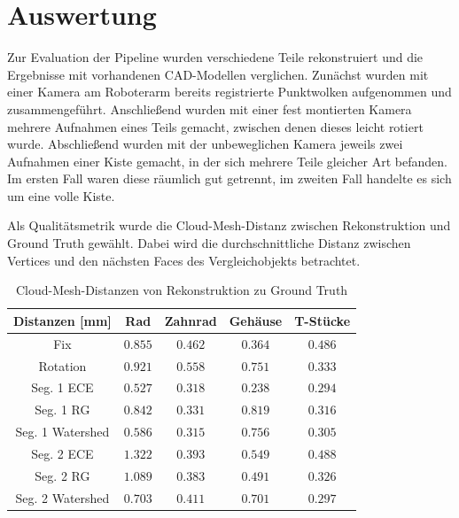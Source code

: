 
\chapter{Auswertung}
\label{ch:auswertung}

Zur Evaluation der Pipeline wurden verschiedene Teile rekonstruiert und die Ergebnisse mit vorhandenen CAD-Modellen verglichen.
Zunächst wurden mit einer Kamera am Roboterarm bereits registrierte Punktwolken aufgenommen und zusammengeführt.
Anschließend wurden mit einer fest montierten Kamera mehrere Aufnahmen eines Teils gemacht, zwischen denen dieses leicht rotiert wurde.
Abschließend wurden mit der unbeweglichen Kamera jeweils zwei Aufnahmen einer Kiste gemacht, in der sich mehrere Teile gleicher Art befanden.
Im ersten Fall waren diese räumlich gut getrennt, im zweiten Fall handelte es sich um eine volle Kiste.

Als Qualitätsmetrik wurde die Cloud-Mesh-Distanz zwischen Rekonstruktion und Ground Truth gewählt.
Dabei wird die durchschnittliche Distanz zwischen Vertices und den nächsten Faces des Vergleichobjekts betrachtet.

\begin{table}[H]
	\centering
	\begin{tabular}{| c || c | c | c | c |}
		\hline
		\textbf{Distanzen [mm]} & Rad & Zahnrad & Gehäuse & T-Stücke\\
		\hline\hline
		Fix & $0.855$ & $0.462$ & $0.364$ & $0.486$\\
		\hline
		Rotation & $0.921$ & $0.558$ & $0.751$ & $0.333$\\
		\hline
		Seg. 1 \ac{ECE} & $0.527$ & $0.318$ & $0.238$ & $0.294$\\
		\hline
		Seg. 1 \ac{RG} & $0.842$ & $0.331$ & $0.819$ & $0.316$\\
		\hline
		Seg. 1 Watershed & $0.586$ & $0.315$ & $0.756$ & $0.305$\\
		\hline
		Seg. 2 \ac{ECE} & $1.322$ & $0.393$ & $0.549$ & $0.488$\\
		\hline
		Seg. 2 \ac{RG} & $1.089$ & $0.383$ & $0.491$ & $0.326$\\
		\hline
		Seg. 2 Watershed & $0.703$ & $0.411$ & $0.701$ & $0.297$\\
		\hline
	\end{tabular}
	\caption{Cloud-Mesh-Distanzen von Rekonstruktion zu Ground Truth}
	\label{tab:dist-mesh-gt}
\end{table}


